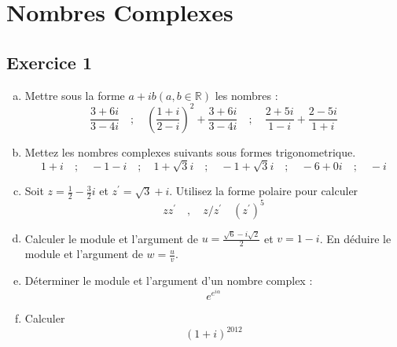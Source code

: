 \chapter{Nombres Complexes}

\section*{Exercice 1}

\begin{enumerate}[a)]
    \item  Mettre sous la forme $a+i b(a, b \in \mathbb{R})$ les nombres :
    $$
    \frac{3+6 i}{3-4 i} \quad ; \quad\left(\frac{1+i}{2-i}\right)^2+\frac{3+6 i}{3-4 i} \quad ; \quad \frac{2+5 i}{1-i}+\frac{2-5 i}{1+i}
    $$
    \item Mettez les nombres complexes suivants sous formes trigonometrique.
    $$
    1+i \quad ; \quad-1-i \quad ; \quad 1+\sqrt{3} i \quad ; \quad-1+\sqrt{3} i \quad ; \quad-6+0 i \quad ; \quad-i
    $$
    \item Soit $z=\frac{1}{2}-\frac{3}{2} i$ et $z^{\prime}=\sqrt{3}+i$. Utilisez la forme polaire pour calculer
    $$
    z z^{\prime} \quad, \quad z / z^{\prime} \quad\left(z^{\prime}\right)^5
    $$
    \item Calculer le module et l'argument de $u=\frac{\sqrt{6}-i \sqrt{2}}{2}$ et $v=1-i$. En déduire le module et l'argument de $w=\frac{u}{v}$.
    \item Déterminer le module et l'argument d'un nombre complex :
    $$
    e^{e^{i \alpha}}
    $$
    \item Calculer
    $$
    (1+i)^{2012}
    $$
\end{enumerate}


